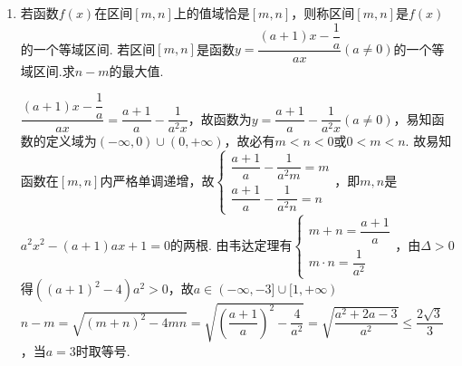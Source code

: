 \begin{enumerate}
    \begin{jieda}
        $g(x)$的定义域为$[-2, 2]$，$g(x)$值域为$[-1, 1]$，故有$-2 \leq a < b \leq 2, -1 \leq \dfrac{1}{b} < \dfrac{1}{a} \leq 1$，解得$1 \leq a < b \leq 2$或$-2 \leq a < b \leq -1$.
        因此两个倒域区间为$\left[1, \dfrac{1+\sqrt{5}}{2}\right]$和$\left[-\dfrac{1+\sqrt{5}}{2}, -1\right]$
    \end{jieda}
    \item 若函数$f(x)$在区间$[m, n]$上的值域恰是$[m, n]$，则称区间$[m, n]$是$f(x)$的一个等域区间. 若区间$[m,n]$是函数$y = \dfrac{(a+1)x - \dfrac{1}{a}}{ax}(a \neq 0)$的一个等域区间.求$n-m$的最大值.
    \begin{jieda}
        $\dfrac{(a+1)x - \dfrac{1}{a}}{ax} = \dfrac{a+1}{a} - \dfrac{1}{a^2x}$，故函数为$y = \dfrac{a+1}{a} - \dfrac{1}{a^2x} (a \neq 0)$，易知函数的定义域为$(-\infty, 0) \cup (0, +\infty)$，故必有$m < n < 0$或$0 < m < n$. 故易知函数在$[m, n]$内严格单调递增，故$\left \{ \begin{array}{l}
                \dfrac{a+1}{a} - \dfrac{1}{a^2m} = m \\
                \dfrac{a+1}{a} - \dfrac{1}{a^2n} = n
            \end{array} \right.$，即$m, n$是$a^2x^2 - (a+1)ax + 1 = 0$的两根. 由韦达定理有$\left \{ \begin{array}{l}
                m+n = \dfrac{a+1}{a}\\
                m \cdot n = \dfrac{1}{a^2}
            \end{array} \right.$，由$\Delta > 0$得$((a+1)^2 - 4)a^2 > 0$，故$a \in (-\infty, -3]\cup [1, +\infty)$ \\
            $n - m = \sqrt{(m+n)^2 - 4mn} = \sqrt{(\dfrac{a+1}{a})^2 - \dfrac{4}{a^2}} = \sqrt{\dfrac{a^2+2a-3}{a^2}} \leq \dfrac{2\sqrt{3}}{3}$，当$a = 3$时取等号.
    \end{jieda}
\end{enumerate}

